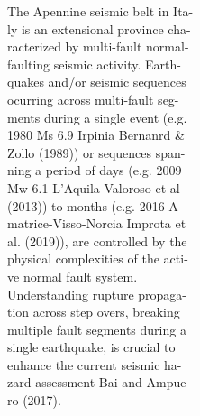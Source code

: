 \begin{poster}
{\begin{minipage}{0.44\linewidth}
{\begin{spacing}{1.0}
 The Apennine seismic belt in Ita-\\
 ly is an extensional province cha-\\
 racterized by multi-fault normal-\\
 faulting seismic activity. Earth-\\
 quakes and/or seismic sequences \\
 ocurring across multi-fault seg-\\
 ments during a single event (e.g. \\
 1980 Ms 6.9 Irpinia Bernanrd \&\\
 Zollo (1989)) or sequences span-\\
 ning a period of days (e.g. 2009 \\
 Mw 6.1 L’Aquila Valoroso et al \\ 
 (2013)) to months (e.g. 2016 A-\\
 matrice-Visso-Norcia Improta et\\
 al. (2019)), are controlled by the\\
 physical complexities of the acti-\\
 ve normal fault system. \\
 
 Understanding rupture propaga- \\
 tion across step overs, breaking\\
 multiple fault segments during a\\
 single earthquake, is crucial to\\
 enhance the current seismic ha-\\
 zard assessment Bai and Ampue-\\
 ro (2017). \\ \nocite{Bai_2017_ESD} \\
 \end{spacing} 
 }
\end{minipage}
\vskip -0.8cm


}
\end{poster}
